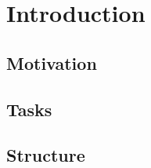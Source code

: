 \section{Introduction}

\subsection{Motivation}


\subsection{Tasks}


\subsection{Structure}
\newpage
